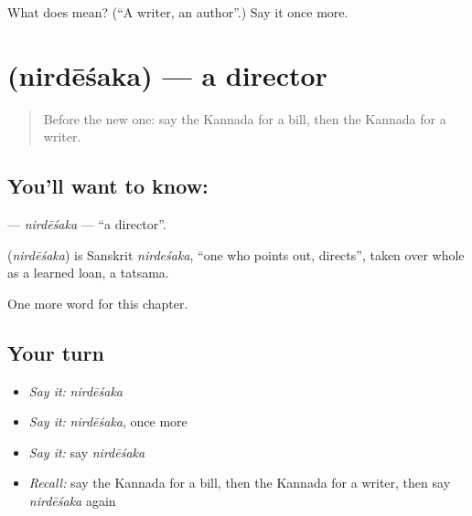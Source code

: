 \begin{tcolorbox}[breakable,colback=teal!4,colframe=teal!35!black,title={Before you move on}]
What does  mean? (\textquotedblleft{}A writer, an author\textquotedblright{}.) Say it once more.
\end{tcolorbox}
\section[\texorpdfstring{\kn{ನಿರ್ದೇಶಕ} (nirdēśaka)}{ನಿರ್ದೇಶಕ (nirdēśaka)}]{ (nirdēśaka) — a director}

\label{lesson:KA-C196-nirdesaka}



\begin{quote}
Before the new one: say the Kannada for a bill, then the Kannada for a writer.
\end{quote}

\subsection*{You'll want to know: }
\textbf{} — \emph{nirdēśaka} — \textquotedblleft{}a director\textquotedblright{}.

\begin{cousinweb}
\textbf{} (\emph{nirdēśaka}) is Sanskrit \emph{nirdeśaka}, \textquotedblleft{}one who points out, directs\textquotedblright{}, taken over whole as a learned loan, a tatsama.
\end{cousinweb}

\begin{grammarlens}[title={What you've built}]
One more word for this chapter.
\end{grammarlens}

\subsection*{Your turn}
\begin{itemize}
\raggedright
  \item \emph{Say it:} \emph{nirdēśaka}
  \item \emph{Say it:} \emph{nirdēśaka}, once more
  \item \emph{Say it:} say \emph{nirdēśaka}
  \item \emph{Recall:} say the Kannada for a bill, then the Kannada for a writer, then say \emph{nirdēśaka} again
\end{itemize}

